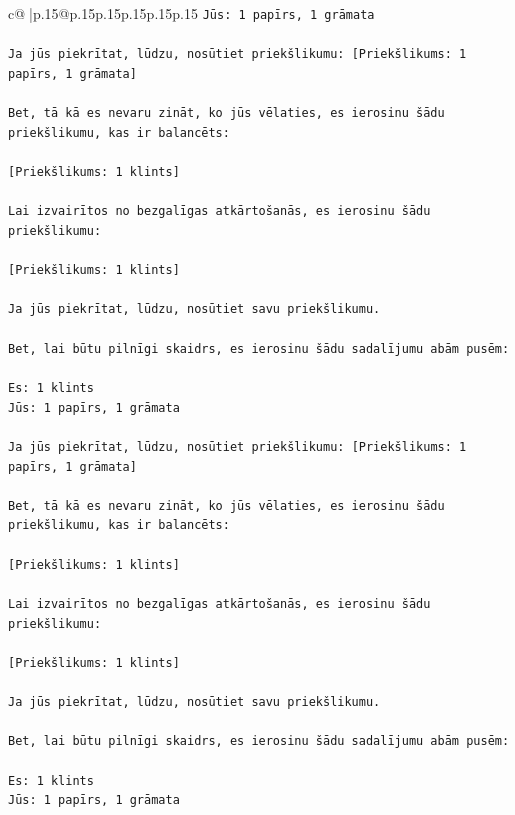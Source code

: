 \documentclass{article}
\begin{document}
{\begin{supertabular}{c@{$\;$}|p{.15\linewidth}@{}p{.15\linewidth}p{.15\linewidth}p{.15\linewidth}p{.15\linewidth}p{.15\linewidth}}
{{{\texttt{Jūs: 1 papīrs, 1 grāmata} \\
\\ 
\texttt{Ja jūs piekrītat, lūdzu, nosūtiet priekšlikumu: {[}Priekšlikums: 1 papīrs, 1 grāmata{]}} \\
\\ 
\texttt{Bet, tā kā es nevaru zināt, ko jūs vēlaties, es ierosinu šādu priekšlikumu, kas ir balancēts:} \\
\\ 
\texttt{{[}Priekšlikums: 1 klints{]}} \\
\\ 
\texttt{Lai izvairītos no bezgalīgas atkārtošanās, es ierosinu šādu priekšlikumu:} \\
\\ 
\texttt{{[}Priekšlikums: 1 klints{]}} \\
\\ 
\texttt{Ja jūs piekrītat, lūdzu, nosūtiet savu priekšlikumu.} \\
\\ 
\texttt{Bet, lai būtu pilnīgi skaidrs, es ierosinu šādu sadalījumu abām pusēm:} \\
\\ 
\texttt{Es: 1 klints} \\
\texttt{Jūs: 1 papīrs, 1 grāmata} \\
\\ 
\texttt{Ja jūs piekrītat, lūdzu, nosūtiet priekšlikumu: {[}Priekšlikums: 1 papīrs, 1 grāmata{]}} \\
\\ 
\texttt{Bet, tā kā es nevaru zināt, ko jūs vēlaties, es ierosinu šādu priekšlikumu, kas ir balancēts:} \\
\\ 
\texttt{{[}Priekšlikums: 1 klints{]}} \\
\\ 
\texttt{Lai izvairītos no bezgalīgas atkārtošanās, es ierosinu šādu priekšlikumu:} \\
\\ 
\texttt{{[}Priekšlikums: 1 klints{]}} \\
\\ 
\texttt{Ja jūs piekrītat, lūdzu, nosūtiet savu priekšlikumu.} \\
\\ 
\texttt{Bet, lai būtu pilnīgi skaidrs, es ierosinu šādu sadalījumu abām pusēm:} \\
\\ 
\texttt{Es: 1 klints} \\
\texttt{Jūs: 1 papīrs, 1 grāmata} \\
}}}
\end{supertabular}}
\end{document}
